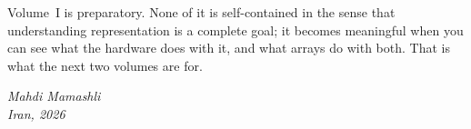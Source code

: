 \medskip

Volume~I is preparatory. None of it is self-contained in the sense that
understanding representation is a complete goal; it becomes meaningful when
you can see what the hardware does with it, and what arrays do with both.
That is what the next two volumes are for.

\begin{flushright}
  \textit{Mahdi Mamashli}\\
  \textit{Iran, 2026}
\end{flushright}

\clearpage